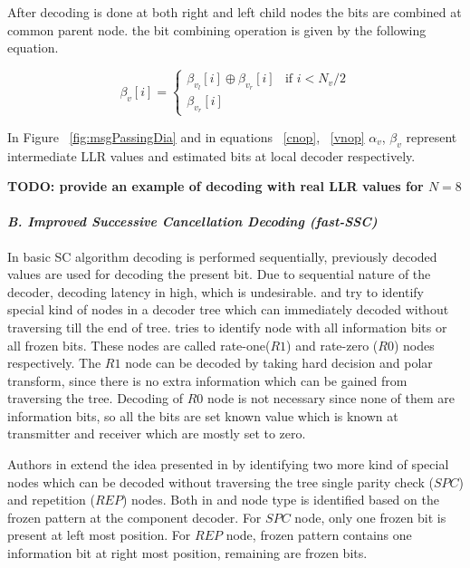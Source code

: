 After decoding is done at both right and left child nodes the bits are combined at common parent node. the bit combining operation is given by the following equation.

\begin{equation*} \label{bitCombination}
\beta_{v}[i] = \begin{cases}
				\beta_{v_{l}}[i] \oplus \beta_{v_{r}}[i] & \text{if }i < N_{v}/2 \\
				\beta_{v_{r}}[i]
				\end{cases}
\end{equation*}

In Figure ~\ref{fig:msgPassingDia} and in equations ~\ref{cnop}, ~\ref{vnop}  $\alpha_{v}$, $\beta_{v}$ represent intermediate LLR values and estimated bits at local decoder respectively.


\textbf{TODO: provide an example of decoding with real LLR values for $N = 8$}

\paragraph{\emph{B. Improved Successive Cancellation Decoding (fast-SSC)}\newline}  \label{fastSSC} 
In basic SC algorithm decoding is performed sequentially, previously decoded values are used for decoding the present bit. Due to sequential nature of the decoder, decoding latency in high, which is undesirable. \cite{SSC} and \cite{fastSSC} try to identify special kind of nodes in a decoder tree which can immediately decoded without traversing till the end of tree. \cite{SSC} tries to identify node with all information bits or all frozen bits. These nodes are called rate-one($R1$) and rate-zero ($R0$) nodes respectively. The $R1$ node can be decoded by taking hard decision and polar transform, since there is no extra information which can be gained from traversing the tree. Decoding of $R0$ node is not necessary since none of them are information bits, so all the bits are set known value which is known at transmitter and receiver which are mostly set to zero. \par Authors in \cite{fastSSC} extend the idea presented in \cite{SSC} by identifying two more kind of special nodes which can be decoded without traversing the tree single parity check ($SPC$) and repetition ($REP$) nodes. Both in \cite{SSC} and \cite{fastSSC} node type is identified based on the frozen pattern at the component decoder. For $SPC$ node, only one frozen bit is present at left most position. For $REP$ node, frozen pattern contains one information bit at right most position, remaining are frozen bits.

